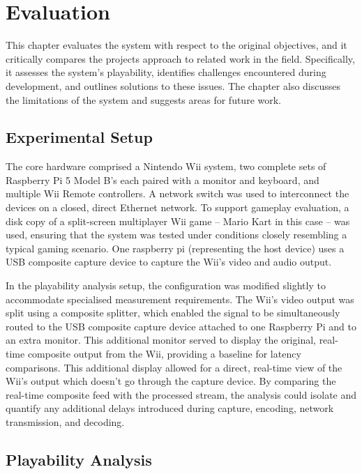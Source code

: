 \chapter{Evaluation}
\label{chapter:evaluation}

This chapter evaluates the system with respect to the original objectives, and it critically compares the projects approach to related work in the field. Specifically, it assesses the system's playability, identifies challenges encountered during development, and outlines solutions to these issues. The chapter also discusses the limitations of the system and suggests areas for future work.

\section{Experimental Setup}
\label{sec:experimental-setup}

The core hardware comprised a Nintendo Wii system, two complete sets of Raspberry Pi 5 Model B's each paired with a monitor and keyboard, and multiple Wii Remote controllers. A network switch was used to interconnect the devices on a closed, direct Ethernet network. To support gameplay evaluation, a disk copy of a split-screen multiplayer Wii game -- Mario Kart in this case -- was used, ensuring that the system was tested under conditions closely resembling a typical gaming scenario. One raspberry pi (representing the host device) uses a USB composite capture device to capture the Wii's video and audio output.

In the playability analysis setup, the configuration was modified slightly to accommodate specialised measurement requirements. The Wii’s video output was split using a composite splitter, which enabled the signal to be simultaneously routed to the USB composite capture device attached to one Raspberry Pi and to an extra monitor. This additional monitor served to display the original, real-time composite output from the Wii, providing a baseline for latency comparisons. This additional display allowed for a direct, real-time view of the Wii’s output which doesn't go through the capture device. By comparing the real-time composite feed with the processed stream, the analysis could isolate and quantify any additional delays introduced during capture, encoding, network transmission, and decoding.

\section{Playability Analysis}
\label{sec:playability-analysis}

